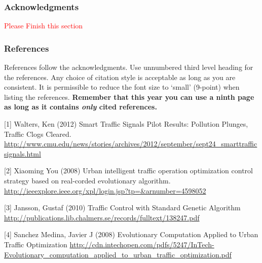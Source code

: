 \documentclass{article} %
\begin{document}
\subsubsection*{Acknowledgments}

\textcolor{red}{Please Finish this section}

\subsubsection*{References}

References follow the acknowledgments. Use unnumbered third level heading for
the references. Any choice of citation style is acceptable as long as you are
consistent. It is permissible to reduce the font size to `small' (9-point) 
when listing the references. {\bf Remember that this year you can use
a ninth page as long as it contains \emph{only} cited references.}

\small{
[1] Walters, Ken (2012) Smart Traffic Signals Pilot Results: Pollution Plunges, Traffic Clogs Cleared. \url{http://www.cmu.edu/news/stories/archives/2012/september/sept24_smarttrafficsignals.html}

[2] Xiaoming You (2008) Urban intelligent traffic operation optimization control strategy based on real-corded evolutionary algorithm. \url{http://ieeexplore.ieee.org/xpl/login.jsp?tp=&arnumber=4598052}

[3] Jansson, Gustaf (2010) Traffic Control with Standard Genetic Algorithm \url{http://publications.lib.chalmers.se/records/fulltext/138247.pdf}

[4] Sanchez Medina, Javier J (2008) Evolutionary Computation Applied to Urban Traffic Optimization \url{http://cdn.intechopen.com/pdfs/5247/InTech-Evolutionary_computation_applied_to_urban_traffic_optimization.pdf}
}
\end{document}
